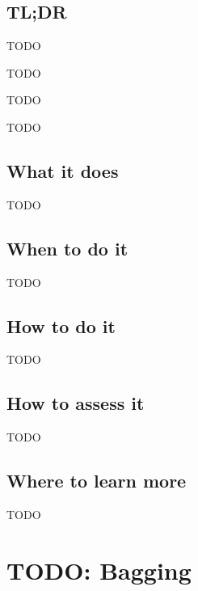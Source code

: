 \documentclass[
]{book}
\providecommand{\tightlist}{%
  \setlength{\itemsep}{0pt}\setlength{\parskip}{0pt}}
\begin{document}
\hypertarget{tldr-14}{%
\section{TL;DR}\label{tldr-14}}

\begin{description}
\tightlist
\item[What it does]
TODO
\item[When to do it]
TODO
\item[How to do it]
TODO
\item[How to assess it]
TODO
\end{description}

\hypertarget{what-it-does-14}{%
\section{What it does}\label{what-it-does-14}}

TODO

\hypertarget{when-to-do-it-14}{%
\section{When to do it}\label{when-to-do-it-14}}

TODO

\hypertarget{how-to-do-it-14}{%
\section{How to do it}\label{how-to-do-it-14}}

TODO

\hypertarget{how-to-assess-it-14}{%
\section{How to assess it}\label{how-to-assess-it-14}}

TODO

\hypertarget{where-to-learn-more-14}{%
\section{Where to learn more}\label{where-to-learn-more-14}}

TODO

\hypertarget{bagging}{%
\chapter{TODO: Bagging}\label{bagging}}
\end{document}
